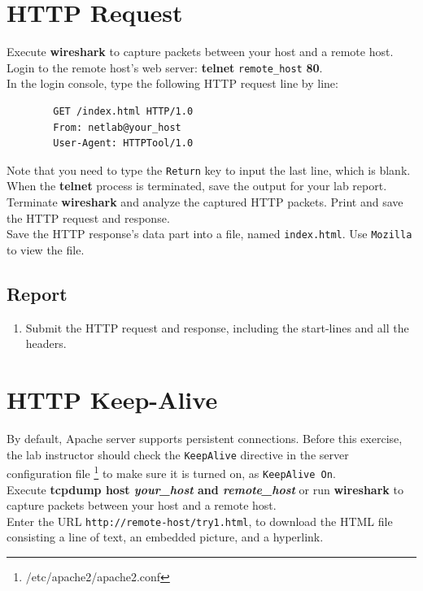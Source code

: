 \documentclass[10pt,a4paper]{article}
\numberwithin{equation}{section}
\numberwithin{figure}{section}
\numberwithin{table}{section}
\begin{document}
\section{HTTP Request}
    Execute \textbf{wireshark} to capture packets between your host and a remote host. \\
    Login to the remote host’s web server: \textbf{telnet} \texttt{remote\_host} \textbf{80}. \\
    In the login console, type the following HTTP request line by line:
    \begin{verbatim}
        GET /index.html HTTP/1.0
        From: netlab@your_host
        User-Agent: HTTPTool/1.0
    \end{verbatim}
    Note that you need to type the \texttt{Return} key to input the last line, which is blank.
    When the \textbf{telnet} process is terminated, save the output for your lab report. \\
    Terminate \textbf{wireshark} and analyze the captured HTTP packets.
    Print and save the HTTP request and response. \\
    Save the HTTP response’s data part into a file, named \texttt{index.html}.
    Use \texttt{Mozilla} to view the file.
    \subsection*{Report}
    \begin{enumerate}
        \item Submit the HTTP request and response, including the start-lines and all the headers.
    \end{enumerate}

    
\section{HTTP Keep-Alive}
    By default, Apache server supports persistent connections. Before this exercise, the lab instructor should check the \texttt{KeepAlive} directive in the server configuration file \footnote{/etc/apache2/apache2.conf} to make sure it is turned on, as \texttt{KeepAlive On}. \\
    Execute \textbf{tcpdump host \textit{your\_host} and \textit{remote\_host}} or run \textbf{wireshark} to capture packets between your host and a remote host. \\
    
    Enter the URL \texttt{http://remote-host/try1.html}, to download the HTML file consisting a line of text, an embedded picture, and a hyperlink.\\
\end{document}
